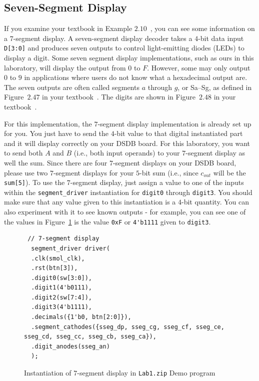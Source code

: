 \documentclass{article}
\begin{document}
\subsection{Seven-Segment Display}

If you examine your textbook in Example $2.10$~\cite{ddca-riscv},
you can see some
information on a $7$-segment display.
A seven-segment display decoder takes a $4$-bit data input
\verb!D[3:0]! and produces seven outputs to control light-emitting
diodes (LEDs) to display a digit.
Some seven segment display implementations, such as ours in this
laboratory, will display the output from $0$ to $F$.  However, some
may only output $0$ to $9$ in applications where users do not know
what a hexadecimal output are.
The seven outputs are often
called segments $a$ through $g$, or Sa–Sg, as defined in Figure~$2.47$ in
your textbook~\cite{ddca-riscv}. The
digits are shown in Figure~$2.48$ in your textbook~\cite{ddca-riscv}.

For this implementation, the $7$-segment display implementation is
already set up for you.  You just have to send the $4$-bit value to
that digital instantiated part and it will display correctly on your
DSDB board.  For this laboratory, you want to send both $A$ and $B$
(i.e., both input operands) to your $7$-segment display as well the
sum.  Since there are four $7$-segment displays on your DSDB board,
please use two $7$-segment
displays for your $5$-bit sum (i.e., since $c_{out}$
will be the \verb!sum[5]!).  To use the $7$-segment display, just
assign a value to one of the inputs within the \verb!segment_driver!
instantiation for
\verb!digit0! through \verb!digit3!.  You should make sure that any value
given to this instantiation is a $4$-bit quantity.  You can also experiment
with it to see known outputs - for example, you can see one of the
values in
Figure~\ref{demo.fig} is the value \verb!0xF! or \verb!4'b1111!
given to \verb!digit3!.
\begin{figure}
{\small
\begin{verbatim}
 // 7-segment display
  segment_driver driver(
  .clk(smol_clk),
  .rst(btn[3]),
  .digit0(sw[3:0]),
  .digit1(4'b0111),
  .digit2(sw[7:4]),
  .digit3(4'b1111),
  .decimals({1'b0, btn[2:0]}),
  .segment_cathodes({sseg_dp, sseg_cg, sseg_cf, sseg_ce, sseg_cd, sseg_cc, sseg_cb, sseg_ca}),
  .digit_anodes(sseg_an)
  );
\end{verbatim}
}
\cprotect\caption{Instantiation of $7$-segment display in
  \verb!Lab1.zip! Demo program}
\label{demo.fig}
\end{figure}
\end{document}
